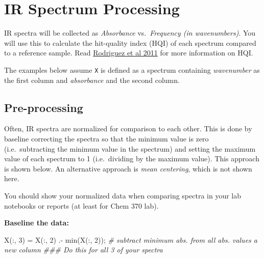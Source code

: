 \documentclass[]{tufte-book}
\newenvironment{Shaded}{}{}
\newcommand{\CommentTok}[1]{\textcolor[rgb]{0.38,0.63,0.69}{\textit{#1}}}
\newcommand{\FloatTok}[1]{\textcolor[rgb]{0.25,0.63,0.44}{#1}}
\newcommand{\FunctionTok}[1]{\textcolor[rgb]{0.02,0.16,0.49}{#1}}
\newcommand{\NormalTok}[1]{#1}
\newcommand{\OperatorTok}[1]{\textcolor[rgb]{0.40,0.40,0.40}{#1}}
\begin{document}
\hypertarget{ir-spectrum-processing}{%
\section*{IR Spectrum Processing}\label{ir-spectrum-processing}}

IR spectra will be collected as \emph{Absorbance} vs.~\emph{Frequency (in wavenumbers)}. You will use this to calculate the hit-quality index (HQI) of each spectrum compared to a reference sample. Read \href{https://www.researchgate.net/publication/51602215_Standardization_of_Raman_spectra_for_transfer_of_spectral_libraries_across_different_instruments}{Rodriguez et al 2011} for more information on HQI.

The examples below assume \texttt{X} is defined as a spectrum containing \emph{wavenumber} as the first column and \emph{absorbance} and the second column.

\hypertarget{pre-processing}{%
\subsection*{Pre-processing}\label{pre-processing}}

Often, IR spectra are normalized for comparison to each other. This is done by baseline correcting the spectra so that the minimum value is zero (i.e.~subtracting the minimum value in the spectrum) and setting the maximum value of each spectrum to 1 (i.e.~dividing by the maximum value). This approach is shown below. An alternative approach is \emph{mean centering}, which is not shown here.

You should show your normalized data when comparing spectra in your lab notebooks or reports (at least for Chem 370 lab).

\textbf{Baseline the data:}

\begin{Shaded}
\begin{Highlighting}[]
\NormalTok{X(}\OperatorTok{:,} \FloatTok{3}\NormalTok{) }\OperatorTok{=}\NormalTok{ X(}\OperatorTok{:,} \FloatTok{2}\NormalTok{) .}\OperatorTok{-} \FunctionTok{min}\NormalTok{(X(}\OperatorTok{:,} \FloatTok{2}\NormalTok{))}\OperatorTok{;}  \CommentTok{# subtract minimum abs. from all abs. values a new column}
\CommentTok{### Do this for all 3 of your spectra}
\end{Highlighting}
\end{Shaded}
\end{document}

